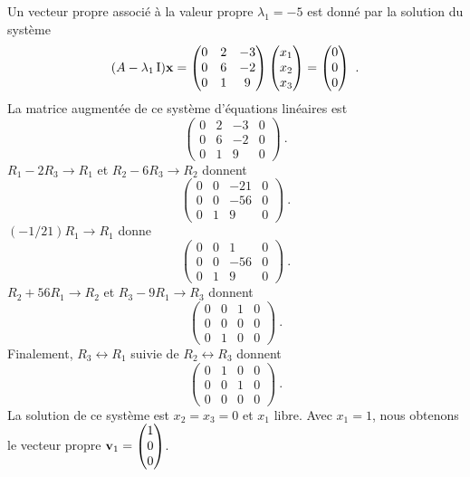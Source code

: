 { Un vecteur propre associé à la valeur propre
$\lambda_1 = -5$ est donné par la solution du système
\[
(A-\lambda_1\operatorname{I})\mathbf{x} = 
\begin{pmatrix}
0 & 2 & -3 \\ 0 & 6 & -2 \\ 0 & 1 & 9
\end{pmatrix}
\begin{pmatrix} x_1 \\ x_2 \\ x_3 \end{pmatrix}
= \begin{pmatrix} 0 \\ 0 \\ 0 \end{pmatrix} \ .
\]
La matrice augmentée de ce système d'équations linéaires est
\[
\left(\begin{array}{ccc|c}
0 & 2 & -3 & 0 \\ 0 & 6 & -2 & 0 \\ 0 & 1 & 9 & 0
\end{array}\right) \ .
\]
$R_1-2R_3 \rightarrow R_1$ et $R_2-6R_3 \rightarrow R_2$ donnent
\[
\left(\begin{array}{ccc|c}
0 & 0 & -21 & 0 \\ 0 & 0 & -56 & 0 \\ 0 & 1 & 9 & 0
\end{array}\right) \ .
\]
$(-1/21)R_1 \rightarrow R_1$ donne
\[
\left(\begin{array}{ccc|c}
0 & 0 & 1 & 0 \\ 0 & 0 & -56 & 0 \\ 0 & 1 & 9 & 0
\end{array}\right) \ .
\]
$R_2+56 R_1\rightarrow R_2$ et $R_3-9R_1 \rightarrow R_3$ donnent
\[
\left(\begin{array}{ccc|c}
0 & 0 & 1 & 0 \\ 0 & 0 & 0 & 0 \\ 0 & 1 & 0 & 0
\end{array}\right) \ .
\]
Finalement, $R_3 \leftrightarrow R_1$ suivie de
$R_2\leftrightarrow R_3$ donnent
\[
\left(\begin{array}{ccc|c}
0 & 1 & 0 & 0 \\ 0 & 0 & 1 & 0 \\ 0 & 0 & 0 & 0
\end{array}\right) \ .
\]
La solution de ce système est $x_2=x_3=0$ et $x_1$ libre.  Avec $x_1=1$,
nous obtenons le vecteur propre
$\displaystyle \mathbf{v}_1 = \begin{pmatrix} 1 \\ 0 \\ 0 \end{pmatrix}$.

}
